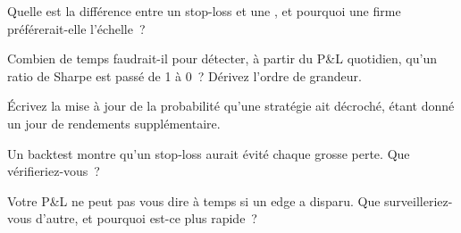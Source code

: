 \begin{interviewq}\label{iq:fm:managing-a-book-through-drawdown:2}
Quelle est la différence entre un stop-loss et une , et pourquoi une firme préférerait-elle l'échelle~?
\end{interviewq}

\begin{interviewq}\label{iq:fm:managing-a-book-through-drawdown:3}
Combien de temps faudrait-il pour détecter, à partir du P\&L quotidien, qu'un ratio de Sharpe est passé de 1 à 0~? Dérivez l'ordre de grandeur.
\end{interviewq}

\begin{interviewq}\label{iq:fm:managing-a-book-through-drawdown:4}
Écrivez la mise à jour de la probabilité qu'une stratégie ait décroché, étant donné un jour de rendements supplémentaire.
\end{interviewq}

\begin{interviewq}\label{iq:fm:managing-a-book-through-drawdown:5}
Un backtest montre qu'un stop-loss aurait évité chaque grosse perte. Que vérifieriez-vous~?
\end{interviewq}

\begin{interviewq}\label{iq:fm:managing-a-book-through-drawdown:6}
Votre P\&L ne peut pas vous dire à temps si un edge a disparu. Que surveilleriez-vous d'autre, et pourquoi est-ce plus rapide~?
\end{interviewq}

